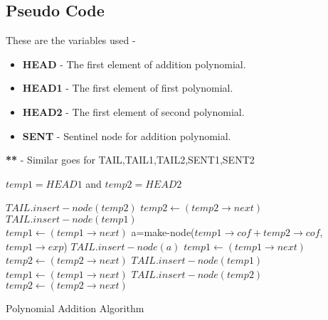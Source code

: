 \documentclass[20pt]{article}
\begin{document}
\subsection{Pseudo Code}
These are the variables used - 
\begin{itemize}
\item \textbf{HEAD}   - The first element of addition polynomial.
\item \textbf{HEAD1} - The first element of first polynomial.
\item \textbf{HEAD2} - The first element of second polynomial.
\item \textbf{SENT}   - Sentinel node for addition polynomial.
\end{itemize}
\textbf{**} - Similar goes for {TAIL,TAIL1,TAIL2,SENT1,SENT2}

\newcommand\mycommfont[1]{\small\ttfamily\textcolor{blue}{#1}}

\begin{algorithm}


	
	$temp1 = HEAD1$ and $temp2 = HEAD2$ \\

	 {
		 {
			$TAIL.insert-node(temp2)$  
			$temp2 \leftarrow (temp2 \rightarrow next)$
		} {    {
					$TAIL.insert-node(temp1)$ \\
					$temp1 \leftarrow (temp1 \rightarrow next)$
				} {
					 {
							 {
									a=make-node($temp1 \rightarrow cof + temp2 \rightarrow cof$,$temp1 \rightarrow exp$)
									$TAIL.insert-node(a)$
							} { } 
							$temp1 \leftarrow (temp1 \rightarrow next)$ \\
							$temp2 \leftarrow (temp2 \rightarrow next)$
					} {
							 {
								$TAIL.insert-node(temp1)$ \\	
								$temp1 \leftarrow (temp1 \rightarrow next)$
							} {
								$TAIL.insert-node(temp2)$ \\
								$temp2 \leftarrow (temp2 \rightarrow next)$	
							}	
					}
				}
		}
	}
	\KwRet{}
	\caption{Polynomial Addition Algorithm}	

\end{algorithm}
\end{document}
